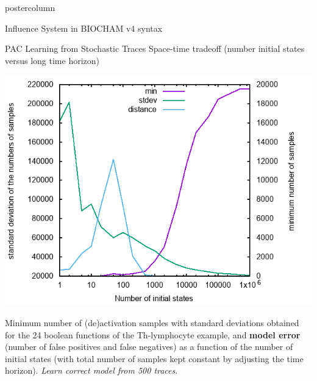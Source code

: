 \documentclass[final,hyperref={pdfpagelabels=false},xcolor=dvipsnames]{beamer}
\newlength{\columnheight}
\begin{document}
\begin{frame}[fragile]
\begin{columns}
    \begin{column}{.49\textwidth}
      \begin{beamercolorbox}[center,wd=\textwidth]{postercolumn}
        \begin{minipage}[T]{.95\textwidth} %
          \parbox[t][\columnheight]{\textwidth}{ %
            \begin{block}{Influence System in BIOCHAM v4 syntax}
\small
   
	    \end{block}
            \vfill
            \begin{block}{PAC Learning from Stochastic Traces}
Space-time tradeoff (number initial states versus long time horizon)

   \includegraphics[width=\textwidth]{statistics/statistics.png}

Minimum number of (de)activation samples with standard deviations
obtained for the 24 boolean functions of the Th-lymphocyte example, 
and {\bf model error} (number of false positives and false negatives) 
as a function of the number of initial states 
(with total number of samples kept constant by adjusting the time horizon). %
\emph{Learn correct model from 500 traces}.


\end{block}}
\end{minipage}
\end{beamercolorbox}
\end{column}
\end{columns}
\end{frame}
\end{document}
